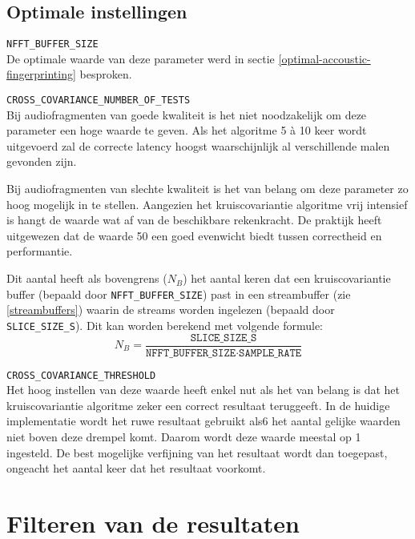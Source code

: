 \subsection{Optimale instellingen}
\begin{description}	
	\item\texttt{NFFT\_BUFFER\_SIZE} \hfill \\
	De optimale waarde van deze parameter werd in sectie \ref{optimal-accoustic-fingerprinting} besproken.
	
	\item\texttt{CROSS\_COVARIANCE\_NUMBER\_OF\_TESTS} \hfill \\
	Bij audiofragmenten van goede kwaliteit is het niet noodzakelijk om deze parameter een hoge waarde te geven. Als het algoritme 5 à 10 keer wordt uitgevoerd zal de correcte latency hoogst waarschijnlijk al verschillende malen gevonden zijn. 
	
	Bij audiofragmenten van slechte kwaliteit is het van belang om deze parameter zo hoog mogelijk in te stellen. Aangezien het kruiscovariantie algoritme vrij intensief is hangt de waarde wat af van de beschikbare rekenkracht. De praktijk heeft uitgewezen dat de waarde 50 een goed evenwicht biedt tussen correctheid en performantie.
	
	Dit aantal heeft als bovengrens ($ N_B $) het aantal keren dat een kruiscovariantie buffer (bepaald door \texttt{NFFT\_BUFFER\_SIZE}) past in een streambuffer (zie \ref{streambuffers}) waarin de streams worden ingelezen (bepaald door \texttt{SLICE\_SIZE\_S}). Dit kan worden berekend met volgende formule:
	\begin{equation}
		N_B = \frac{\texttt{SLICE\_SIZE\_S}}{\texttt{NFFT\_BUFFER\_SIZE} \cdot \texttt{SAMPLE\_RATE}}
	\end{equation}
	
	\item\texttt{CROSS\_COVARIANCE\_THRESHOLD} \hfill \\
	Het hoog instellen van deze waarde heeft enkel nut als het van belang is dat het kruiscovariantie algoritme zeker een correct resultaat teruggeeft. In de huidige implementatie wordt het ruwe resultaat gebruikt als6 het aantal gelijke waarden niet boven deze drempel komt. Daarom wordt deze waarde meestal op 1 ingesteld. De best mogelijke verfijning van het resultaat wordt dan toegepast, ongeacht het aantal keer dat het resultaat voorkomt. 
\end{description}

\section{Filteren van de resultaten}
\label{filtering}

